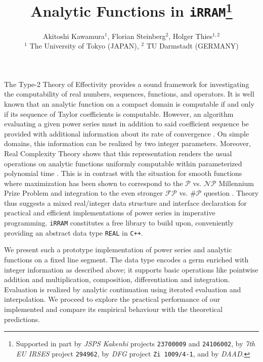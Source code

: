 \documentclass{article}
\newcommand{\p}{\ensuremath{\mathcal P}\xspace}
\newcommand{\np}{\ensuremath{\mathcal{NP}}\xspace}
\newcommand{\fp}{\ensuremath{\mathcal{FP}}\xspace}
\newcommand{\sharpp}{\ensuremath{\# \mathcal{P}}\xspace}
\newcommand{\cc}{\texttt{C++}\xspace}
\newcommand{\irram}{\texttt{iRRAM}\xspace}
\newcommand{\REAL}{\texttt{REAL}\xspace}
\begin{document}
\title{Analytic Functions in \irram\thanks{
Supported in part by \emph{JSPS Kakenhi} projects
\texttt{23700009} and \texttt{24106002},
by \emph{7th EU IRSES} project \texttt{294962},
by \emph{DFG} project \texttt{Zi\,1009/4-1},
and by \emph{DAAD}.}}
\author{Akitoshi Kawamura$^1$, \quad Florian Steinberg$^2$, \quad Holger Thies$^{1,2}$ 
\\
$^1$ The University of Tokyo (JAPAN), \quad $^2$ TU Darmstadt (GERMANY)}
\date{}
\maketitle
\noindent
The Type-2 Theory of Effectivity provides a sound framework for investigating the computability of real numbers, sequences, functions, and operators.
It is well known that an analytic function on a compact domain is computable if and only if its sequence of Taylor coefficients is computable.
However, an algorithm evaluating a given power series must in addition to said coefficient sequence be provided with additional information about its rate of convergence \cite{Mueller95}.
On simple domains, this information can be realized by two integer parameters.
Moreover, Real Complexity Theory shows that this representation renders the usual operations on analytic functions uniformly computable within parameterized polynomial time \cite{Kawamura2012}.
This is in contrast with the situation for smooth functions where maximization has been shown to correspond to the \p vs. \np Millennium Prize Problem \cite{MR666209} and integration to the even stronger \fp vs. \sharpp question \cite{MR748898,MR1137517}.
Theory thus suggests a mixed real/integer data structure and interface declaration for practical and efficient implementations of power series in imperative programming.
\irram constitutes a free library to build upon, conveniently providing an abstract data type \REAL in \cc.

We present such a prototype implementation of power series and analytic functions on a fixed line segment.
The data type encodes a germ enriched with integer information as described above;
it supports basic operations like pointwise addition and multiplication, composition, differentiation and integration.
Evaluation is realized by analytic continuation using iterated evaluation and interpolation.
We proceed to explore the practical performance of our implemented and compare its empirical behaviour with the theoretical predictions.

\bigskip
\end{document}
